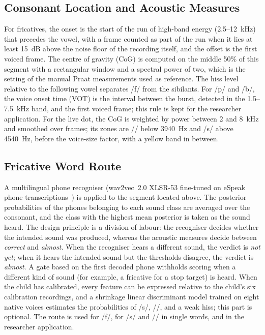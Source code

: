 \documentclass[conference]{IEEEtran}
\newcommand{\ipa}[1]{/#1/}
\begin{document}
\subsection{Consonant Location and Acoustic Measures}
For fricatives, the onset is the start of the run of high-band energy (2.5--12~kHz) that precedes the vowel, with a frame counted as part of the run when it lies at least 15~dB above the noise floor of the recording itself, and the offset is the first voiced frame. The centre of gravity (CoG) is computed on the middle 50\% of this segment with a rectangular window and a spectral power of two, which is the setting of the manual Praat measurements used as reference. The hiss level relative to the following vowel separates \ipa{f} from the sibilants. For \ipa{p} and \ipa{b}, the voice onset time (VOT) is the interval between the burst, detected in the 1.5--7.5~kHz band, and the first voiced frame; this rule is kept for the researcher application. For the live dot, the CoG is weighted by power between 2 and 8~kHz and smoothed over frames; its zones are \ipa{\textesh} below 3940~Hz and \ipa{s} above 4540~Hz, before the voice-size factor, with a yellow band in between.

\subsection{Fricative Word Route}
A multilingual phone recogniser (wav2vec~2.0 XLSR-53 fine-tuned on eSpeak phone transcriptions~\cite{baevski2020,xu2022}) is applied to the segment located above. The posterior probabilities of the phones belonging to each sound class are averaged over the consonant, and the class with the highest mean posterior is taken as the sound heard. The design principle is a division of labour: the recogniser decides whether the intended sound was produced, whereas the acoustic measures decide between \textit{correct} and \textit{almost}. When the recogniser hears a different sound, the verdict is \textit{not yet}; when it hears the intended sound but the thresholds disagree, the verdict is \textit{almost}. A gate based on the first decoded phone withholds scoring when a different kind of sound (for example, a fricative for a stop target) is heard. When the child has calibrated, every feature can be expressed relative to the child's six calibration recordings, and a shrinkage linear discriminant model trained on eight native voices estimates the probabilities of \ipa{s}, \ipa{\textesh}, and a weak hiss; this part is optional. The route is used for \ipa{f}, for \ipa{s} and \ipa{\textesh} in single words, and in the researcher application.
\end{document}
